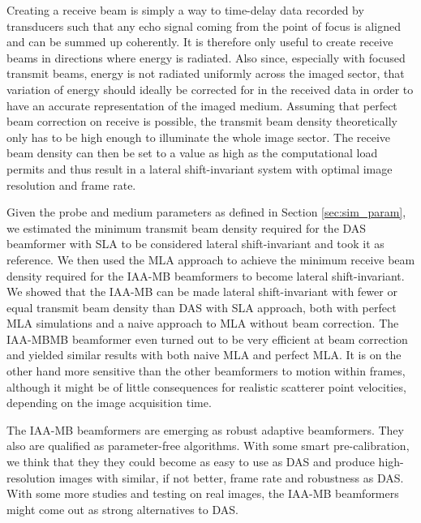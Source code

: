 Creating a receive beam is simply a way to time-delay data recorded by transducers such that any echo signal coming from the point of focus is aligned and can be summed up coherently. It is therefore only useful to create receive beams in directions where energy is radiated.
Also since, especially with focused transmit beams, energy is not radiated uniformly across the imaged sector, that variation of energy should ideally be corrected for in the received data in order to have an accurate representation of the imaged medium.
Assuming that perfect beam correction on receive is possible, the transmit beam density theoretically only has to be high enough to illuminate the whole image sector. The receive beam density can then be set to a value as high as the computational load permits and thus result in a lateral shift-invariant system with optimal image resolution and frame rate.

Given the probe and medium parameters as defined in Section \ref{sec:sim_param}, we estimated the minimum transmit beam density required for the DAS beamformer with SLA to be considered lateral shift-invariant and took it as reference.
We then used the MLA approach to achieve the minimum receive beam density required for the IAA-MB beamformers to become lateral shift-invariant.
We showed that the IAA-MB can be made lateral shift-invariant with fewer or equal transmit beam density than DAS with SLA approach, both with perfect MLA simulations and a naive approach to MLA without beam correction.
The IAA-MBMB beamformer even turned out to be very efficient at beam correction and yielded similar results with both naive MLA and perfect MLA.
It is on the other hand more sensitive than the other beamformers to motion within frames, although it might be of little consequences for realistic scatterer point velocities, depending on the image acquisition time.

The IAA-MB beamformers are emerging as robust adaptive beamformers.
They also are qualified as parameter-free algorithms. With some smart pre-calibration, we think that they they could become as easy to use as DAS and produce high-resolution images with similar, if not better, frame rate and robustness as DAS.
With some more studies and testing on real images, the IAA-MB beamformers might come out as strong alternatives to DAS.

